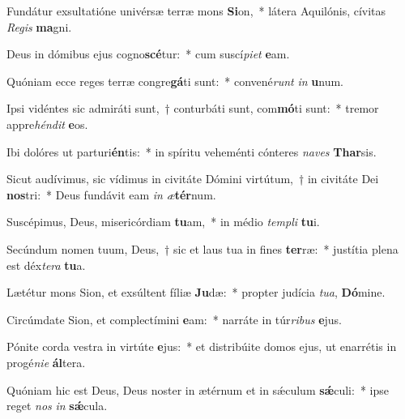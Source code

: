 \item Fundátur exsultatióne univérsæ terræ mons \textbf{Si}on,~* látera Aquilónis, cívitas \textit{Re}\textit{gis} \textbf{ma}gni.
\item Deus in dómibus ejus cogno\textbf{scé}tur:~* cum suscí\textit{pi}\textit{et} \textbf{e}am.
\item Quóniam ecce reges terræ congre\textbf{gá}ti sunt:~* convené\textit{runt} \textit{in} \textbf{u}num.
\item Ipsi vidéntes sic admiráti sunt,~† conturbáti sunt, com\textbf{mó}ti sunt:~* tremor appre\textit{hén}\textit{dit} \textbf{e}os.
\item Ibi dolóres ut parturi\textbf{én}tis:~* in spíritu veheménti cónteres \textit{na}\textit{ves} \textbf{Thar}sis.
\item Sicut audívimus, sic vídimus in civitáte Dómini virtútum,~† in civitáte Dei \textbf{nos}tri:~* Deus fundávit eam \textit{in} \textit{æ}\textbf{tér}num.
\item Suscépimus, Deus, misericórdiam \textbf{tu}am,~* in médio \textit{tem}\textit{pli} \textbf{tu}i.
\item Secúndum nomen tuum, Deus,~† sic et laus tua in fines \textbf{ter}ræ:~* justítia plena est déx\textit{te}\textit{ra} \textbf{tu}a.
\item Lætétur mons Sion, et exsúltent fíliæ \textbf{Ju}dæ:~* propter judícia \textit{tu}\textit{a}, \textbf{Dó}mine.
\item Circúmdate Sion, et complectímini \textbf{e}am:~* narráte in túr\textit{ri}\textit{bus} \textbf{e}jus.
\item Pónite corda vestra in virtúte \textbf{e}jus:~* et distribúite domos ejus, ut enarrétis in progé\textit{ni}\textit{e} \textbf{ál}tera.
\item Quóniam hic est Deus, Deus noster in ætérnum et in sǽculum \textbf{sǽ}culi:~* ipse reget \textit{nos} \textit{in} \textbf{sǽ}cula.
